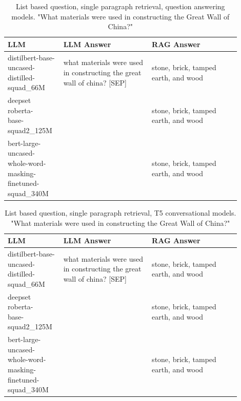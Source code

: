 \documentclass{wseas}
\begin{document}
\begin{table}[htbp]
  \centering
  \caption{List based question, single paragraph retrieval, question answering models. "What materials were used in constructing the Great Wall of China?"} %
  \label{tab:experiment_R_1_paragraph_Q_listBased_M_QaModels_table}  %
  \begin{tabular}{|p{0.20\linewidth}|p{0.35\linewidth}|p{0.35\linewidth}|}
    \hline
    \textbf{LLM} & \textbf{LLM Answer} & \textbf{RAG Answer} \\
    \hline
    \makecell[l]{distilbert-base-uncased-\\distilled-squad\_66M} & what materials were used in constructing the great wall of china? {[}SEP{]} & stone, brick, tamped earth, and wood \\
    \hline
    \makecell[l]{deepset roberta-\\base-squad2\_125M} & & stone, brick, tamped earth, and wood \\
    \hline
    \makecell[l]{bert-large-uncased-\\whole-word-masking-\\finetuned-squad\_340M} & & stone, brick, tamped earth, and wood \\
    \hline
  \end{tabular}
\end{table}
\begin{table}[htbp]
  \centering
  \caption{List based question, single paragraph retrieval, T5 conversational models. "What materials were used in constructing the Great Wall of China?"}
  \label{tab:experiment_R_1_paragraph_Q_listBased_M_T5Models_table}  %
  \begin{tabular}{|p{0.20\linewidth}|p{0.35\linewidth}|p{0.35\linewidth}|}
    \hline
    \textbf{LLM} & \textbf{LLM Answer} & \textbf{RAG Answer} \\
    \hline
    \makecell[l]{distilbert-base-uncased-\\distilled-squad\_66M} & what materials were used in constructing the great wall of china? {[}SEP{]} & stone, brick, tamped earth, and wood \\
    \hline
    \makecell[l]{deepset roberta-\\base-squad2\_125M} & & stone, brick, tamped earth, and wood \\
    \hline
    \makecell[l]{bert-large-uncased-\\whole-word-masking-\\finetuned-squad\_340M} & & stone, brick, tamped earth, and wood \\
    \hline
  \end{tabular}
\end{table}
\end{document}
